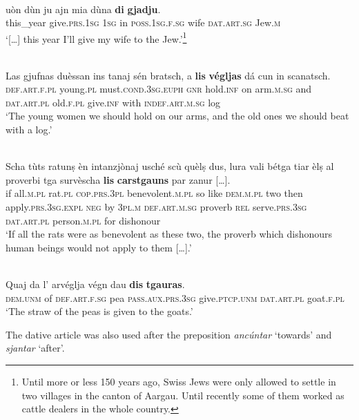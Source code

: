 \ea
{}\\
\gll […] uòn dùn ju ajn mia dùna \textbf{di} \textbf{gjadju}.\\
{} this\_year give.\textsc{prs.1sg} \textsc{1sg} in \textsc{poss.1sg.f.sg} wife \textsc{dat.art.sg} Jew.\textsc{m} \\
\glt `[…] this year I’ll give my wife to the Jew.'\footnote{Until more or less 150 years ago, Swiss Jews were only allowed to settle in two villages in the canton of Aargau. Until recently some of them worked as cattle dealers in the whole country.}
\z

\ea
{}\\
\gll   Las gjufnas duèssan ins tanaj sén bratsch, a \textbf{lis} \textbf{végljas} dá cun in scanatsch.\\
\textsc{def.art.f.pl} young.\textsc{pl} must.\textsc{cond.3sg.euph} \textsc{gnr} hold.\textsc{inf} on arm.\textsc{m.sg} and \textsc{dat.art.pl} old.\textsc{f.pl} give.\textsc{inf} with \textsc{indef.art.m.sg} log\\
\glt `The young women we should hold on our arms, and the old ones we should beat with a log.'
\z

\ea
{}\\
\gll  Scha tùts ratunṣ èn intanzjònaj usché scù quèlṣ dus, lura vali bétga tiar èlṣ al proverbi tga survèscha \textbf{lis} \textbf{carstgauns} par zanur […].\\
     if all.\textsc{m.pl} rat.\textsc{pl} \textsc{cop.prs.3pl} benevolent.\textsc{m.pl} so like \textsc{dem.m.pl} two then apply.\textsc{prs.3sg.expl}  \textsc{neg}  by \textsc{3pl.m}  \textsc{def.art.m.sg} proverb \textsc{rel}  serve.\textsc{prs.3sg}  \textsc{dat.art.pl} person.\textsc{m.pl} for dishonour\\
\glt `If all the rats were as benevolent as these two, the proverb which dishonours human beings would not apply to them […].'
\z

\ea
{}\\
\gll Quaj da l’ arvéglja végn dau \textbf{dis} \textbf{tgauras}.  \\
\textsc{dem.unm} of \textsc{def.art.f.sg} pea \textsc{pass.aux.prs.3sg} give.\textsc{ptcp.unm} \textsc{dat.art.pl} goat.\textsc{f.pl} \\
\glt `The straw of the peas is given to the goats.'
\z

The dative article was also used after the preposition \textit{ancúntar} `towards' and \textit{sjantar} `after'.

